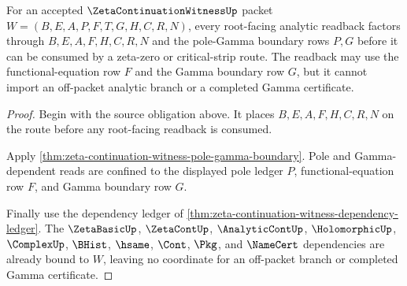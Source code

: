 \begin{theorem}
\label{thm:zeta-continuation-witness-analytic-readback-obligation}
For an accepted $\ZetaContinuationWitnessUp$ packet $W=(B,E,A,P,F,T,G,H,C,R,N)$, every root-facing analytic readback factors through $B,E,A,F,H,C,R,N$ and the pole-Gamma boundary rows $P,G$ before it can be consumed by a zeta-zero or critical-strip route. The readback may use the functional-equation row $F$ and the Gamma boundary row $G$, but it cannot import an off-packet analytic branch or a completed Gamma certificate.
\end{theorem}
\begin{proof}
Begin with the source obligation above. It places $B,E,A,F,H,C,R,N$ on the route before any root-facing readback is consumed.

Apply \autoref{thm:zeta-continuation-witness-pole-gamma-boundary}. Pole and Gamma-dependent reads are confined to the displayed pole ledger $P$, functional-equation row $F$, and Gamma boundary row $G$.

Finally use the dependency ledger of \autoref{thm:zeta-continuation-witness-dependency-ledger}. The $\ZetaBasicUp$, $\ZetaContUp$, $\AnalyticContUp$, $\HolomorphicUp$, $\ComplexUp$, $\BHist$, $\hsame$, $\Cont$, $\Pkg$, and $\NameCert$ dependencies are already bound to $W$, leaving no coordinate for an off-packet branch or completed Gamma certificate.
\end{proof}

